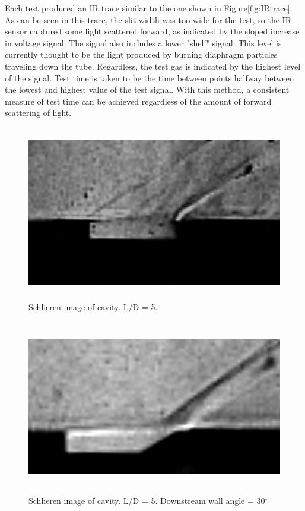 Each test produced an IR trace similar to the one shown in Figure\ref{fig:IRtrace}. As can be seen in this trace, the slit width was too wide for the test, so the IR sensor captured some light scattered forward, as indicated by the sloped increase in voltage signal. The signal also includes a lower "shelf" signal. This level is currently thought to be the light produced by burning diaphragm particles traveling down the tube. Regardless, the test gas is indicated by the highest level of the signal. Test time is taken to be the time between points halfway between the lowest and highest value of the test signal. With this method, a consistent measure of test time can be achieved regardless of the amount of forward scattering of light. 


\newpage

\begin{figure}
\centering
\includegraphics[height = 3in]{Figures/5.jpg}
\caption[Schlieren image of cavity. L/D = 5.]{Schlieren image of cavity. L/D = 5.}
\label{fig:5}
\end{figure}

\begin{figure}
\centering
\includegraphics[height = 3in]{Figures/5-30.jpg}
\caption[Schlieren image of cavity with angled downstream wall. L/D = 5.]{Schlieren image of cavity. L/D = 5. Downstream wall angle = 30$^\circ$}
\label{fig:5-30}
\end{figure}

